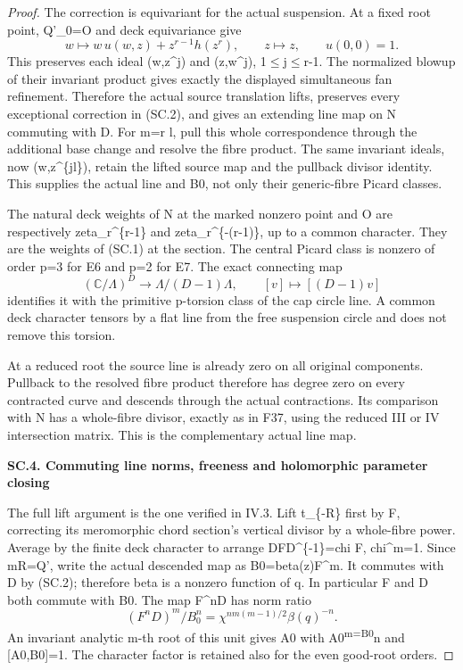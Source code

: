 \begin{proof}
The correction is equivariant for the actual suspension. At a
fixed root point, Q'\_0=O and deck equivariance give
\[
 w\longmapsto w\,u(w,z)+z^{r-1}h(z^r),\qquad z\longmapsto z,
 \qquad u(0,0)=1.
\]
This preserves each ideal (w,z\^{}j) and (z,w\^{}j), 1\(\le\)j\(\le\)r-1.
The normalized blowup of their invariant product gives exactly
the displayed simultaneous fan refinement. Therefore the actual
source translation lifts, preserves every exceptional correction
in (SC.2), and gives an extending line map on N commuting with D.
For m=r l, pull this whole correspondence through the additional
base change and resolve the fibre product. The same invariant
ideals, now (w,z\^{}\{jl\}), retain the lifted source map and the
pullback divisor identity. This supplies the actual line and B0,
not only their generic-fibre Picard classes.

The natural deck weights of N at the marked nonzero point and O
are respectively zeta\_r\^{}\{r-1\} and zeta\_r\^{}\{-(r-1)\}, up to a common
character. They are the weights of (SC.1) at the section. The
central Picard class is nonzero of order p=3 for E6 and p=2 for
E7. The exact connecting map
\[
 (\mathbb C/\Lambda)^D\longrightarrow\Lambda/(D-1)\Lambda,
 \qquad[v]\longmapsto[(D-1)v]
\]
identifies it with the primitive p-torsion class of the cap circle
line. A common deck character tensors by a flat line from the
free suspension circle and does not remove this torsion.

At a reduced root the source line is already zero on all original
components. Pullback to the resolved fibre product therefore has
degree zero on every contracted curve and descends through the
actual contractions. Its comparison with N has a whole-fibre
divisor, exactly as in F37, using the reduced III or IV
intersection matrix. This is the complementary actual line map.

\par

\medskip\noindent\textbf{SC.4. Commuting line norms, freeness and holomorphic parameter closing}

The full lift argument is the one verified in IV.3. Lift t\_\{-R\}
first by F, correcting its meromorphic chord section's vertical
divisor by a whole-fibre power. Average by the finite deck character
to arrange DFD\^{}\{-1\}=chi F, chi\^{}m=1. Since mR=Q', write the actual
descended map as B0=beta(z)F\^{}m. It commutes with D by (SC.2);
therefore beta is a nonzero function of q. In particular F and D
both commute with B0. The map F\^{}nD has norm ratio
\[
 (F^nD)^m/B_0^n=\chi^{nm(m-1)/2}\beta(q)^{-n}.
\]
An invariant analytic m-th root of this unit gives A0 with
A0\textsuperscript{m=B0}n and {[}A0,B0{]}=1. The character factor is retained also
for the even good-root orders.


\end{proof}
